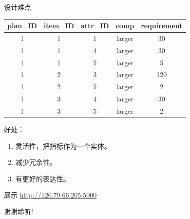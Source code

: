 \documentclass{beamer}
\begin{document}
\begin{frame}{设计难点}
{  }
  

   {

    \begin{tabular}{|c|c|c|c|c|}
      \hline
      plan\_ID & item\_ID & attr\_ID & comp   & requirement  \\ \hline
      1 &       1 &       1 & larger &          30  \\ \hline
      1 &       1 &       4 & larger &          30  \\ \hline
      1 &       1 &       5 & larger &           5  \\ \hline
      1 &       2 &       3 & larger &         120  \\ \hline
      1 &       2 &       5 & larger &           2  \\ \hline
      1 &       3 &       4 & larger &          30  \\ \hline
      1 &       3 &       5 & larger &           2  \\ \hline
      \end{tabular}

    好处：
    \begin{enumerate}
    \item 灵活性，把指标作为一个实体。
    \item 减少冗余性。
    \item 有更好的表达性。
    \end{enumerate}
  }
    
\end{frame}
  
\begin{frame}{展示}
\url{http://120.79.66.205:5000}
\end{frame}

\begin{frame}
  \begin{center}
    \huge{谢谢聆听!}
  \end{center}
\end{frame}
\end{document}
